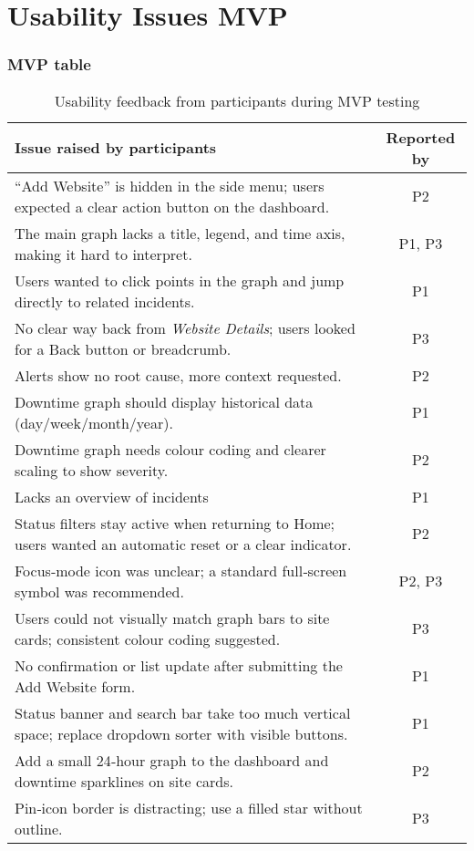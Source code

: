 \section{Usability Issues MVP}
\label{app:usability_issues_mvp}


\subsubsection{MVP table}
\begin{table}[H]
\centering
\begin{tabular}{|p{8.2cm}|c|}
\hline
\textbf{Issue raised by participants} & \textbf{Reported by} \\ \hline
“Add Website” is hidden in the side menu; users expected a clear action button on the dashboard. & P2\\ \hline
The main graph lacks a title, legend, and time axis, making it hard to interpret. & P1, P3 \\ \hline
Users wanted to click points in the graph and jump directly to related incidents. & P1 \\ \hline
No clear way back from \textit{Website Details}; users looked for a Back button or breadcrumb. & P3 \\ \hline
Alerts show no root cause, more context requested.& P2 \\ \hline
Downtime graph should display historical data (day/week/month/year). & P1 \\ \hline
Downtime graph needs colour coding and clearer scaling to show severity. & P2 \\ \hline
Lacks an overview of incidents& P1 \\ \hline
Status filters stay active when returning to Home; users wanted an automatic reset or a clear indicator. & P2 \\ \hline
Focus‑mode icon was unclear; a standard full‑screen symbol was recommended. & P2, P3 \\ \hline
Users could not visually match graph bars to site cards; consistent colour coding suggested. & P3 \\ \hline
No confirmation or list update after submitting the Add Website form. & P1 \\ \hline
Status banner and search bar take too much vertical space; replace dropdown sorter with visible buttons. & P1 \\ \hline
Add a small 24‑hour graph to the dashboard and downtime sparklines on site cards. & P2 \\ \hline
Pin‑icon border is distracting; use a filled star without outline. & P3 \\ \hline
\end{tabular}
\caption{Usability feedback from participants during MVP testing}
\label{tab:mvp-issues}
\end{table}